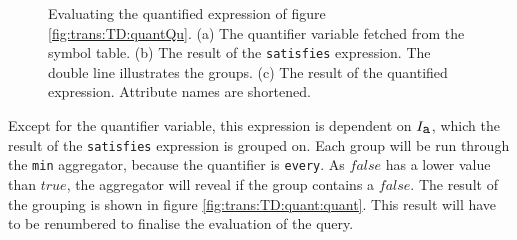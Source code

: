\begin{myExample}
\begin{figure}[h]
\centering
{}
\qquad
{}
\qquad
{}

\caption[Evaluating the quantified expression]{Evaluating the quantified expression of figure
\ref{fig:trans:TD:quantQu}. (a) The quantifier variable fetched from the symbol table. (b) The result of the
\texttt{satisfies} expression. The double line illustrates the groups. (c) The result of the quantified
expression. Attribute names are shortened. \label{fig:trans:TD:quantInter} }
\end{figure}

Except for the quantifier variable, this expression is dependent on $I_{\mbox{\texttt{a}}}$, which the result of
the \texttt{satisfies} expression is grouped on. Each group will be run through the \texttt{min} aggregator,
because the quantifier is \texttt{every}. As $false$ has a lower value than $true$, the aggregator will reveal if
the group contains a $false$. The result of the grouping is shown in figure \ref{fig:trans:TD:quant:quant}. This
result will have to be renumbered to finalise the evaluation of the query.
\end{myExample}
